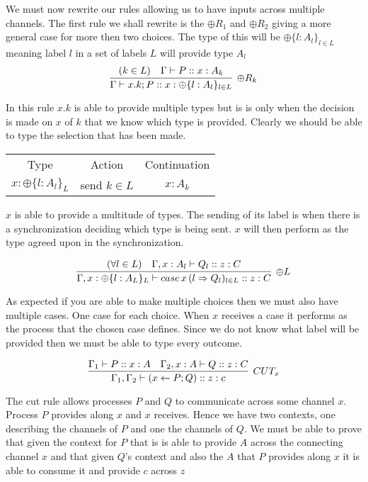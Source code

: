 \documentclass{article}
\begin{document}
We must now rewrite our rules allowing us to have inputs across multiple channels. The first rule we shall rewrite is the \(\oplus R_1 \) and \(\oplus R _2\) giving a more general case for more then two choices. The type of this will be \(\oplus \{ l:A_l \}_{l \in L}\) meaning label \(l\) in a set of labels \(L\) will provide type \(A_l\)
\[
\infer[{\oplus R_k}]
    {\Gamma \vdash x.k;P :: x : \oplus \{ l : A_l \} _{l \in L}}
    {(k \in L) & \Gamma \vdash P :: x:A_k }
\]

In this rule \(x.k\) is able to provide multiple types but is is only when the decision is made on \(x\) of \(k\) that we know which type is provided. Clearly we should be able to type the selection that has been made.


\begin{center}
    \begin{tabular}{ c c c }
     Type & Action & Continuation \\ 
     \(x:\oplus \{ l: A_{l} \}_{L}\) & send \(k \in L\) & \(x:A_k\)   
    \end{tabular}
\end{center}

\(x\) is able to provide a multitude of types. The sending of its label is when there is a synchronization deciding which type is being sent. \(x\) will then perform as the type agreed upon in the synchronization.


\[
\infer[{\oplus L}]
    {\Gamma, x: \oplus \{ l : A_L\}_L \vdash case \, x \, (l \Rightarrow Q_l)_{l \in L} :: z : C }
    {(\forall l \in L) & \Gamma, x:A_l \vdash Q_l :: z:C }
\]

As expected if you are able to make multiple choices then we must also have multiple cases. One case for each choice. When \(x\) receives a case it performs as the process that the chosen case defines. Since we do not know what label will be provided then we must be able to type every outcome.


\[
\infer[{CUT_x}]
    {\Gamma_1 , \Gamma_2 \vdash ( x \leftarrow P ; Q ) :: z :c }
    { \Gamma_1 \vdash P :: x :A & \Gamma_2 , x:A \vdash Q :: z:C }
\]

The cut rule allows processes \(P\) and \(Q\) to communicate across some channel \(x\). Process \(P\) provides along \(x\) and \(x\) receives. Hence we have two contexts, one describing the channels of \(P\) and one the channels of \(Q\). We must be able to prove that given the context for \(P\) that is is able to provide \(A\) across the connecting channel \(x\) and that given \(Q\)'s context and also the \(A\) that \(P\) provides along \(x\) it is able to consume it and provide \(c\) across \(z\)
\end{document}
